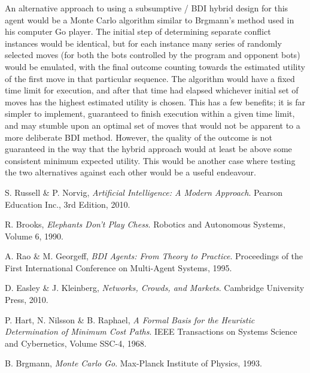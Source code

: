 \documentclass[a4paper,10pt]{article}
\begin{document}
An alternative approach to using a subsumptive / BDI hybrid design for this agent would be a Monte Carlo algorithm similar to Brgmann's method used in his computer Go player\cite{brugmann93}. The initial step of determining separate conflict instances would be identical, but for each instance many series of randomly selected moves (for both the bots controlled by the program and opponent bots) would be emulated, with the final outcome counting towards the estimated utility of the first move in that particular sequence. The algorithm would have a fixed time limit for execution, and after that time had elapsed whichever initial set of moves has the highest estimated utility is chosen. This has a few benefits; it is far simpler to implement, guaranteed to finish execution within a given time limit, and may stumble upon an optimal set of moves that would not be apparent to a more deliberate BDI method. However, the quality of the outcome is not guaranteed in the way that the hybrid approach would at least be above some consistent minimum expected utility. This would be another case where testing the two alternatives against each other would be a useful endeavour.

\begin{thebibliography}{9}
    S. Russell \& P. Norvig,
    \emph{Artificial Intelligence: A Modern Approach}. \newline
    Pearson Education Inc.,
    3rd Edition,
    2010.

    R. Brooks,
    \emph{Elephants Don't Play Chess}. \newline
    Robotics and Autonomous Systems,
    Volume 6,
    1990.

    A. Rao \& M. Georgeff,
    \emph{BDI Agents: From Theory to Practice}. \newline
    Proceedings of the First International Conference on Multi-Agent Systems,
    1995.

    D. Easley \& J. Kleinberg,
    \emph{Networks, Crowds, and Markets}. \newline
    Cambridge University Press,
    2010.

    P. Hart, N. Nilsson \& B. Raphael,
    \emph{A Formal Basis for the Heuristic Determination of Minimum Cost Paths}. \newline
    IEEE Transactions on Systems Science and Cybernetics,
    Volume SSC-4,
    1968.

    B. Brgmann,
    \emph{Monte Carlo Go}. \newline
    Max-Planck Institute of Physics,
    1993.
\end{thebibliography}
\end{document}
